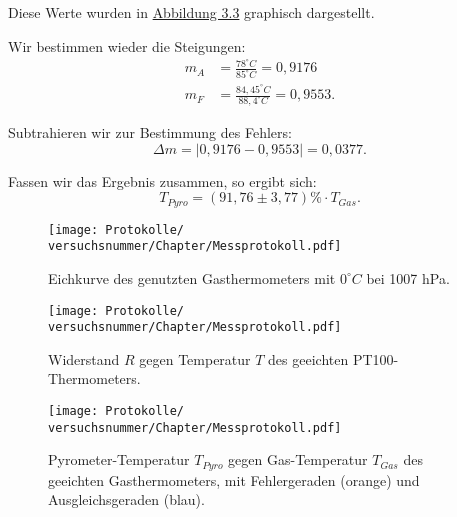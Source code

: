 Diese Werte wurden in \hyperref[fig:t_gegen_t]{Abbildung 3.3} graphisch dargestellt.

Wir bestimmen wieder die Steigungen:
\begin{align}
    m_A &= \frac{78 ^\circ C}{85 ^\circ C} = 0,9176 \\
    m_F &= \frac{84,45 ^\circ C}{88,4 ^\circ C} = 0,9553.
\end{align}

Subtrahieren wir zur Bestimmung des Fehlers:
\begin{equation}
    \Delta m = \left| 0,9176 - 0,9553 \right| = 0,0377.
\end{equation}

Fassen wir das Ergebnis zusammen, so ergibt sich:
\begin{equation}
    \boxed{T_{Pyro} = (91,76 \pm 3,77)\% \cdot T_{Gas}}.
    \label{e:4}
\end{equation}

\onecolumn
\begin{figure}
    \texttt{[image: Protokolle/\\versuchsnummer/Chapter/Messprotokoll.pdf]}
    \caption{Eichkurve des genutzten Gasthermometers mit $0^\circ C$ bei 1007 hPa.}
    \label{fig:graphisch_temp_druck}
\end{figure}

\begin{figure}
    \texttt{[image: Protokolle/\\versuchsnummer/Chapter/Messprotokoll.pdf]}
    \caption{Widerstand $R$ gegen Temperatur $T$ des geeichten PT100-Thermometers.}
    \label{fig:graphisch_temp_widerstand}
\end{figure}

\begin{figure}
    \texttt{[image: Protokolle/\\versuchsnummer/Chapter/Messprotokoll.pdf]}
    \caption{Pyrometer-Temperatur $T_{Pyro}$ gegen Gas-Temperatur $T_{Gas}$ des geeichten Gasthermometers, mit Fehlergeraden (orange) und Ausgleichsgeraden (blau).}
    \label{fig:t_gegen_t}
\end{figure}
\twocolumn

